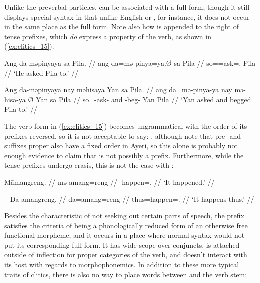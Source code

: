 Unlike the preverbal particles,  can be associated with a full
form, though it still displays special syntax in that unlike English
 or , for instance, it does not occur in the same place as
the full form. Note also how  is appended to the right of tense
prefixes, which \emph{do} express a property of the verb, as shown in 
(\ref{ex:clitics_15}).

\pex\label{ex:clitics_15}
\a\label{ex:clitics_15a}\begingl
	\gla Ang da-məpinyaya sa Pila. //
	\glb ang da=mə-pinya=ya.Ø sa Pila //
	\glc \AgtT{} so=\Pst{}=ask=\TsgM{}.\Top{} \Parg{} Pila //
	\glft `He asked Pila to.' //
\endgl

\a\label{ex:clitics_15b}\begingl
	\gla Ang da-məpinyaya nay məhisaya {} Yan sa Pila. //
	\glb ang da=mə-pinya-ya nay mə-hisa-ya Ø Yan sa Pila //
	\glc \AgtT{} so=\Pst{}-ask-\TsgM{} and \Pst{}-beg-\TsgM{} \Top{} Yan 
		\Parg{} Pila //
	\glft `Yan asked and begged Pila to.' //
\endgl
\xe

The verb form in (\ref{ex:clitics_15}) becomes ungrammatical with the order of
its prefixes reversed, so it is not acceptable to say: 
, although note that pre- and suffixes proper
also have a fixed order in Ayeri, so this alone is probably not enough evidence
to claim that  is not possibly a prefix. Furthermore, while the
tense prefixes undergo crasis, this is not the case with :

\pex\label{ex:clitics_17}
\a\label{ex:clitics_17a}\begingl
	\gla Māmangreng. //
	\glb mə-amang=reng //
	\glc \Pst{}-happen=\TsgI{}.\Aarg{} //
	\glft `It happened.' //
\endgl

\a\label{ex:clitics_17b}\ljudge{*} 
\xe

\pex~\label{ex:clitics_16}
\a\label{ex:clitics_16a}\begingl
	\gla Da-amangreng. //
	\glb da=amang=reng //
	\glc thus=happen=\TsgI{}.\Aarg{} //
	\glft `It happens thus.' //
\endgl

\a\label{ex:clitics_16b}\ljudge{*} 
\xe

Besides the characteristic of not seeking out certain parts of speech, the
 prefix satisfies the criteria of being a phonologically reduced
form of an otherwise free functional morpheme, and it occurs in a place where
normal syntax would not put its corresponding full form. It has wide scope over
conjuncts, is attached outside of inflection for proper categories of the verb,
and doesn't interact with its host with regards to morphophonemics. In addition
to these more typical traits of clitics, there is also no way to place words
between  and the verb stem:

